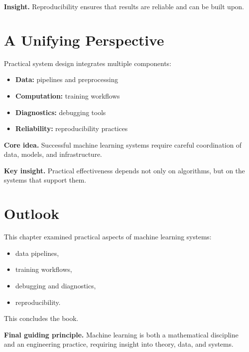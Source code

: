 \noindent
\textbf{Insight.}  
Reproducibility ensures that results are reliable and can be built upon.

\section{A Unifying Perspective}

Practical system design integrates multiple components:

\begin{itemize}
    \item \textbf{Data:} pipelines and preprocessing
    \item \textbf{Computation:} training workflows
    \item \textbf{Diagnostics:} debugging tools
    \item \textbf{Reliability:} reproducibility practices
\end{itemize}

\medskip

\noindent
\textbf{Core idea.}  
Successful machine learning systems require careful coordination of data, models, and infrastructure.

\medskip

\noindent
\textbf{Key insight.}  
Practical effectiveness depends not only on algorithms, but on the systems that support them.

\section{Outlook}

This chapter examined practical aspects of machine learning systems:
\begin{itemize}
    \item data pipelines,
    \item training workflows,
    \item debugging and diagnostics,
    \item reproducibility.
\end{itemize}

\medskip

This concludes the book.

\medskip

\noindent
\textbf{Final guiding principle.}  
Machine learning is both a mathematical discipline and an engineering practice, requiring insight into theory, data, and systems.